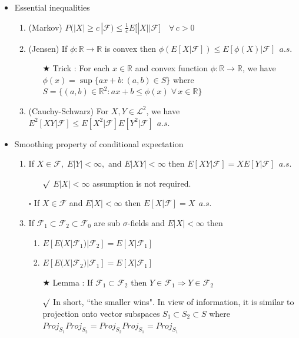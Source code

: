 \documentclass[12pt, A4]{article}
\newcommand{\sq}{$\square$}
\newcommand{\rmk}{$\surd$}
\newcommand{\trick}{$\bigstar$}
\newcommand{\R}{\mathbb{R}}
\newcommand{\F}{\mathcal{F}}
\newcommand{\LL}{\mathcal{L}}
\begin{document}
\begin{itemize}
\begin{itemize}
	\end{itemize}
	\item Essential inequalities
	\begin{enumerate}
		\item (Markov) \; $P(|X|\geq c\,  | \F)\leq \frac{1}{c}E\big[|X| \big| \F \big]\quad \forall \, c>0$
		\item (Jensen) \; If $\phi : \R\rightarrow \R$ is convex then $\phi(E[X|\F])\leq E[\phi(X)|\F]\;\, a.s.$
		\begin{itemize}
			\item[\trick] Trick : For each $x\in \R$ and convex function $\phi:\R\rightarrow \R$, we have \\ $\phi(x)=\sup\{ax+b : (a,b)\in S\}$ where $S=\{(a,b)\in \R^2 : ax+b\leq \phi(x)\;\forall\,x\in \R\}$ 
		\end{itemize}
		\item (Cauchy-Schwarz) For $X, Y\in \LL^2$, we have $E^2[XY|\F]\leq E[X^2|\F]E[Y^2|\F]\;\, a.s.$
	\end{enumerate}
	\item Smoothing property of conditional expectation
	\begin{enumerate}
		\item If $X\in \F, \; E|Y|<\infty, $ and $E|XY|<\infty$ then $E[XY|\F]=XE[Y|\F]\;\,a.s.$
		\begin{itemize}
			\item[\rmk] $E|X|<\infty$ assumption is not required.
		\end{itemize}
		\item[\sq] If $X\in \F$ and $E|X|<\infty$ then $E[X|\F]=X\;\,a.s.$ 
		\item If $\F_1\subset \F_2\subset \F_0$ are sub $\sigma$-fields and $E|X|<\infty$ then 
		\begin{enumerate}
			\item $E[E(X|\F_1)|\F_2]=E[X|\F_1]$
			\item $E[E(X|\F_2)|\F_1]=E[X|\F_1]$
		\end{enumerate}
		\begin{itemize}
			\item[\trick] Lemma :  If $\F_1\subset \F_2$ then $Y\in \F_1\Rightarrow Y\in \F_2$
			\item[\rmk] In short, ``the smaller wins". In view of information, it is similar to projection onto vector subspaces $S_1\subset S_2\subset S$ where $Proj_{S_1}Proj_{S_2}=Proj_{S_2}Proj_{S_1}=Proj_{S_1}$
		\end{itemize}
	\end{enumerate}

\end{itemize}
\end{document}
